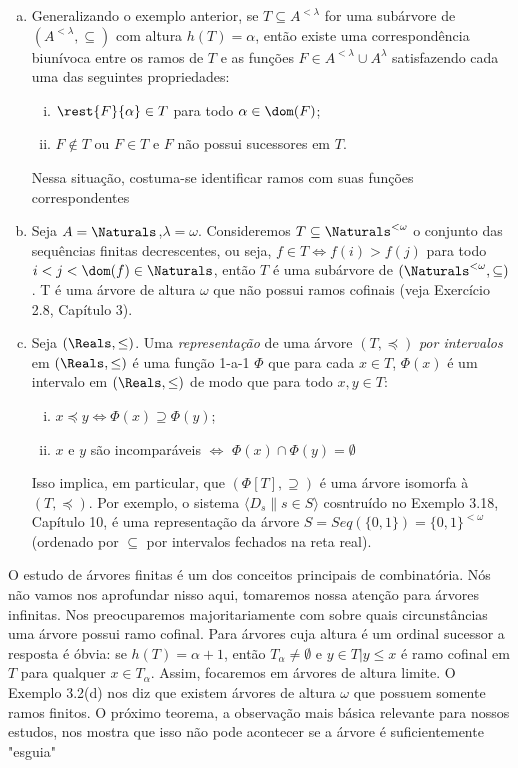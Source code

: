 \documentclass[a4paper]{article}
\theoremstyle{plain}\newtheorem{teo}{Teorema}[section]
\theoremstyle{plain}\newtheorem{prop}[teo]{Proposição}
\theoremstyle{plain}\newtheorem{lem}[teo]{Lema}
\theoremstyle{plain}\newtheorem{cor}[teo]{Corolário}
\theoremstyle{definition}\newtheorem{defi}[teo]{Definição}
\theoremstyle{remark}\newtheorem{rem}[teo]{Observação}
\theoremstyle{definition}\newtheorem{example}[teo]{Exemplo}
\theoremstyle{remark}\newtheorem{step}{\bf Step}
\begin{document}
\begin{exemplo}
\begin{enumerate}[(a)]
    \item Generalizando o exemplo anterior, se
      \(T\subseteq A^{<\lambda}\) for uma subárvore de 
      \((A^{<\lambda},\subseteq)\) com altura \(h(T)=\alpha\), então existe uma
      correspondência biunívoca entre os ramos de \(T\) e as funções
      \(F\in A^{<\lambda}\cup A^\lambda\) satisfazendo cada uma das seguintes
      propriedades:
      \begin{enumerate}[(i)]
      \item \(\rest{F}{\alpha}\in T\) para todo \(\alpha \in \dom(F)\);
      \item \(F\not\in T\) ou \(F\in T\) e \(F\) não possui sucessores em \(T\). 
      \end{enumerate}
     Nessa situação, costuma-se
    identificar ramos com suas funções correspondentes
  \item Seja \(A=\Naturals \),\(\lambda =\omega\). Consideremos
    \(T\subseteq \Naturals^{<\omega}\)
    o conjunto das sequências finitas decrescentes, ou seja, \(f\in T \iff f(i)>f(j)\) 
    para todo \(i<j<\dom(f)\in\Naturals\), então \(T\) é uma subárvore de \((\Naturals^{<\omega},\subseteq)\).
    T é uma árvore de altura \(\omega\) que não possui ramos cofinais (veja Exercício 2.8,
    Capítulo 3).
    \item Seja \((\Reals,\leq)\). Uma \emph{representação} de uma árvore \((T,\preceq)\)
    \emph{por intervalos} em \((\Reals,\leq)\) é uma função 1-a-1 \(\Phi\) que para cada 
    \(x\in T\), \(\Phi (x)\) é um intervalo em \((\Reals,\leq)\) de modo que para todo \(x,y\in T\):
    \begin{enumerate}[(i)]
    \item \(x\preceq y\iff \Phi(x)\supseteq\Phi(y)\); 
    \item \(x\) e \(y\) são incomparáveis \(\iff\) \(\Phi(x)\cap\Phi(y) =\emptyset\)
    \end{enumerate}
    Isso implica, em particular, que \((\Phi[T],\supseteq)\) é uma árvore isomorfa à
    \((T,\preceq)\). Por exemplo, o sistema \(\langle D_s \| s\in S\rangle\) cosntruído
    no Exemplo 3.18, Capítulo 10, é uma representação da árvore \(S=Seq(\{0,1\})=\{0,1\}^{<\omega}\)
    (ordenado por \(\subseteq\) por intervalos fechados na reta real).
    \end{enumerate}
  \end{exemplo}
  
  
  O estudo de árvores finitas é um dos conceitos principais de combinatória. Nós não vamos
  nos aprofundar nisso aqui, tomaremos nossa atenção para árvores infinitas. Nos preocuparemos
  majoritariamente com sobre quais circunstâncias uma árvore possui ramo cofinal.
  Para árvores cuja altura é um ordinal sucessor a resposta é óbvia: se \(h(T)=\alpha +1\),
  então \(T_\alpha\neq\emptyset\) e \({{y\in T | y\leq x}}\) é ramo cofinal em \(T\) para qualquer
  \(x\in T_\alpha\). Assim, focaremos em árvores de altura limite. O Exemplo 3.2(d) nos diz que
  existem árvores de altura \(\omega\) que possuem somente ramos finitos. O próximo teorema, a
  observação mais básica relevante para nossos estudos, nos mostra que isso não pode acontecer se
  a árvore é suficientemente "esguia"
\end{document}
